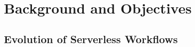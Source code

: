 \section{Background and Objectives}\label{sec:bg}






\subsection{Evolution of Serverless Workflows}

